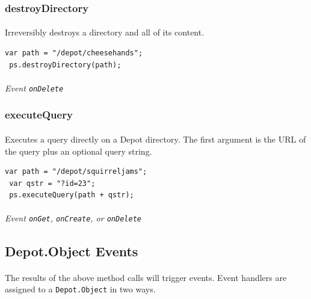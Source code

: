 \documentclass{report}
\begin{document}
\subsubsection{destroyDirectory}
\paragraph{}
Irreversibly destroys a directory and all of its content.
\begin{Verbatim}[frame=single]
 var path = "/depot/cheesehands";
 ps.destroyDirectory(path);
\end{Verbatim}
\paragraph{}
\textit{Event \texttt{onDelete}}


\subsubsection{executeQuery}
\paragraph{}
Executes a query directly on a Depot directory. The first argument is
the URL of the query plus an optional query string.
\begin{Verbatim}[frame=single]
 var path = "/depot/squirreljams";
 var qstr = "?id=23";
 ps.executeQuery(path + qstr);
\end{Verbatim}

\paragraph{}
\textit{Event \texttt{onGet}, \texttt{onCreate}, or \texttt{onDelete}}

\subsection{Depot.Object Events}
\paragraph{}
The results of the above method calls will trigger events. Event
handlers are assigned to a \texttt{Depot.Object} in two ways.

\end{document}
